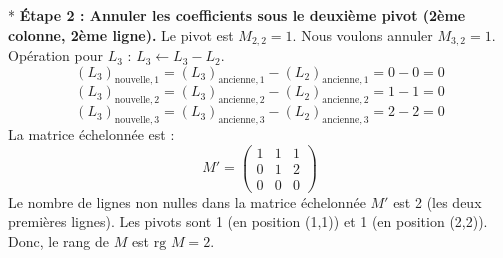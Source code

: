\documentclass[12pt,a4paper]{report}
\begin{document}
        *   \textbf{Étape 2 : Annuler les coefficients sous le deuxième pivot (2ème colonne, 2ème ligne).}
            Le pivot est $M_{2,2}=1$. Nous voulons annuler $M_{3,2}=1$.
            Opération pour $L_3$ : $L_3 \leftarrow L_3 - L_2$.
            $$(L_3)_{\text{nouvelle},1} = (L_3)_{\text{ancienne},1} - (L_2)_{\text{ancienne},1} = 0 - 0 = 0$$
            $$(L_3)_{\text{nouvelle},2} = (L_3)_{\text{ancienne},2} - (L_2)_{\text{ancienne},2} = 1 - 1 = 0$$
            $$(L_3)_{\text{nouvelle},3} = (L_3)_{\text{ancienne},3} - (L_2)_{\text{ancienne},3} = 2 - 2 = 0$$
            La matrice échelonnée est :
            $$M' = \begin{pmatrix} 1 & 1 & 1 \\ 0 & 1 & 2 \\ 0 & 0 & 0 \end{pmatrix}$$
        Le nombre de lignes non nulles dans la matrice échelonnée $M'$ est 2 (les deux premières lignes). Les pivots sont 1 (en position (1,1)) et 1 (en position (2,2)).
        Donc, le rang de $M$ est $\text{rg } M = 2$.
\end{document}
